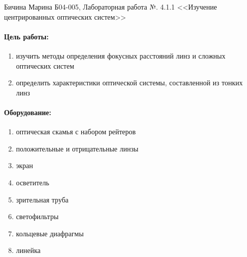 \documentclass[a4paper,12pt]{article}
\author{ \Бичина Марина 
группа Б04-005 1 курса ФЭФМ}
\title{}
\date{}
\begin{document}

\begin{center}
\begin{Large}
{Бичина Марина Б04-005, Лабораторная работа №. 4.1.1 <<Изучение центрированных оптических систем>>}
\end{Large}
\end{center}
\paragraph{Цель работы:} 
\begin{enumerate}
\itemsep0em
\item изучить методы определения фокусных расстояний линз и сложных оптических систем
\item определить характеристики оптической системы, составленной из тонких линз

\end{enumerate}
\paragraph{Оборудование:}
\begin{enumerate}
\itemsep0em
\item оптическая скамья с набором рейтеров
\item положительные и отрицательные линзы
\item экран
\item осветитель
\item зрительная труба
\item светофильтры
\item кольцевые диафрагмы
\item линейка
\end{enumerate}
\end{document}
